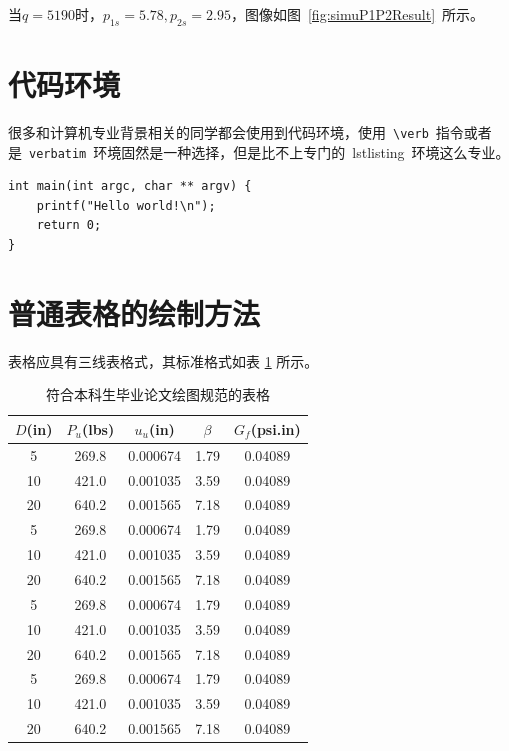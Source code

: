 当$q=5190$时，$p_{1s}=5.78,p_{2s}=2.95$，图像如图~\ref{fig:simuP1P2Result}~所示。


\section{代码环境}

很多和计算机专业背景相关的同学都会使用到代码环境，使用~\verb|\verb|~指令或者是~\verb|verbatim|~环境固然是一种选择，但是比不上专门的~lstlisting~环境这么专业。

\begin{lstlisting}
int main(int argc, char ** argv) {
    printf("Hello world!\n");
    return 0;
}
\end{lstlisting}

\section{普通表格的绘制方法}

表格应具有三线表格式，其标准格式如表 \ref{tab:table1} 所示。
\begin{table}[htbp]
\caption{符合本科生毕业论文绘图规范的表格}\label{tab:table1}
\vspace{0.5em}\centering\wuhao
\begin{tabular}{ccccc}
\toprule[1.5pt]
$D$(in) & $P_u$(lbs) & $u_u$(in) & $\beta$ & $G_f$(psi.in)\\
\midrule[1pt]
 5 & 269.8 & 0.000674 & 1.79 & 0.04089\\
10 & 421.0 & 0.001035 & 3.59 & 0.04089\\
20 & 640.2 & 0.001565 & 7.18 & 0.04089\\
 5 & 269.8 & 0.000674 & 1.79 & 0.04089\\
10 & 421.0 & 0.001035 & 3.59 & 0.04089\\
20 & 640.2 & 0.001565 & 7.18 & 0.04089\\
 5 & 269.8 & 0.000674 & 1.79 & 0.04089\\
10 & 421.0 & 0.001035 & 3.59 & 0.04089\\
20 & 640.2 & 0.001565 & 7.18 & 0.04089\\
 5 & 269.8 & 0.000674 & 1.79 & 0.04089\\
10 & 421.0 & 0.001035 & 3.59 & 0.04089\\
20 & 640.2 & 0.001565 & 7.18 & 0.04089\\
\bottomrule[1.5pt]
\end{tabular}
\vspace{\baselineskip}
\end{table}

%
%
%
%
%
%
